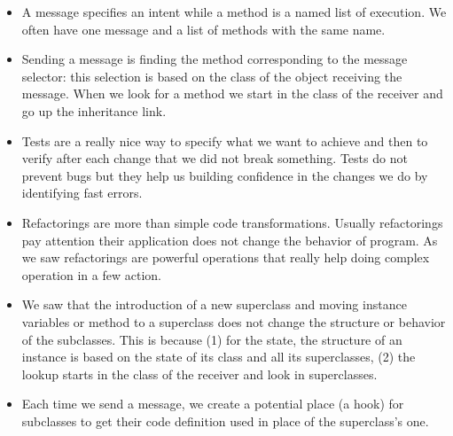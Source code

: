 \documentclass[10pt,twoside,english]{_support/latex/sbabook/sbabook}
\begin{document}
\begin{itemize}
\item A message specifies an intent while a method is a named list of execution. We often have one message and a list of methods with the same name. 
\item Sending a message is finding the method corresponding to the message selector: this selection is based on the class of the object receiving the message. When we look for a method we start in the class of the receiver and go up the inheritance link. 
\item Tests are a really nice way to specify what we want to achieve and then to verify after each change that we did not break something. Tests do not prevent bugs but they help us building confidence in the changes we do by identifying fast errors. 
\item Refactorings are more than simple code transformations. Usually refactorings  pay attention their application does not change the behavior of program. As we saw refactorings are powerful operations that really help doing complex operation in a few action. 
\item We saw that the introduction of a new superclass and moving instance variables or method to a superclass does not change the structure or behavior of the subclasses. This is because (1) for the state, the structure of an instance is based on the state of its class and all its superclasses, (2) the lookup starts in the class of the receiver and look in superclasses. 
\item Each time we send a message, we create a potential place (a hook) for subclasses to get their code definition used in place of the superclass's one.
\end{itemize}


\backmatter



\end{document}
